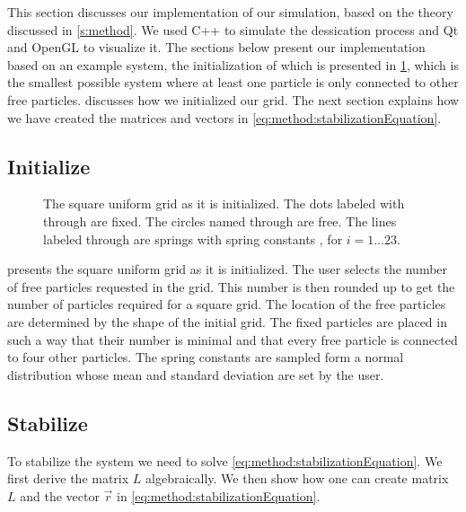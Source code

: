 This section discusses our implementation of our simulation, based on the theory discussed in \cref{s:method}. We used C++ to simulate the dessication process and  Qt\cite{qt} and OpenGL\cite{openGL} to visualize it. The sections below present our implementation based on an example system, the initialization of which is presented in \cref{fig:implementation:intitialGrid}, which is the smallest possible system where at least one particle is only connected to other free particles.  discusses how we initialized our grid. The next section explains how we have created the matrices and vectors in \cref{eq:method:stabilizationEquation}. 

\subsection{Initialize}
	\label{s:implementation:init}
	\begin{figure}
		\centering
		\resizebox{0.9\columnwidth}{!}{%
			\initialGrid
		}
		\caption{The square uniform grid as it is initialized. The dots labeled with  through  are fixed. The circles named  through  are free. The lines labeled  through  are springs with spring constants , for $i = 1\ldots23$.}
		\label{fig:implementation:intitialGrid}
	\end{figure}

	 presents the square uniform grid as it is initialized. 
	The user selects the number of free particles requested in the grid. This number is then rounded up to get the number of particles required for a square grid. The location of the free particles are determined by the shape of the initial grid.
	The fixed particles are placed  in such a way that their number is minimal and that every free particle is connected to four other particles. 
	The spring constants are sampled form a normal distribution whose mean and standard deviation are set by the user. 

\subsection{Stabilize}
	\label{s:implementation:stabilize}
	To stabilize the system we need to solve \cref{eq:method:stabilizationEquation}. We first derive the matrix $L$ algebraically. We then show how one can create matrix $L$ and the vector $\vec{r}$ in \cref{eq:method:stabilizationEquation}.

